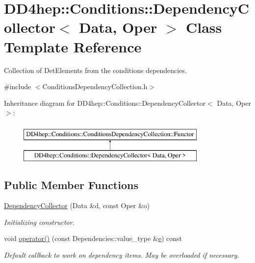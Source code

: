 \hypertarget{class_d_d4hep_1_1_conditions_1_1_dependency_collector}{}\section{D\+D4hep\+:\+:Conditions\+:\+:Dependency\+Collector$<$ Data, Oper $>$ Class Template Reference}
\label{class_d_d4hep_1_1_conditions_1_1_dependency_collector}


Collection of Det\+Elements from the conditions dependencies.  




{\ttfamily \#include $<$Conditions\+Dependency\+Collection.\+h$>$}

Inheritance diagram for D\+D4hep\+:\+:Conditions\+:\+:Dependency\+Collector$<$ Data, Oper $>$\+:\begin{figure}[H]
\begin{center}
\leavevmode
\includegraphics[height=2.000000cm]{class_d_d4hep_1_1_conditions_1_1_dependency_collector}
\end{center}
\end{figure}
\subsection*{Public Member Functions}
\begin{DoxyCompactItemize}
\item 
\hyperlink{class_d_d4hep_1_1_conditions_1_1_dependency_collector_a7631c949b34eeb87fa8aea7ea166c356}{Dependency\+Collector} (Data \&d, const Oper \&o)
\begin{DoxyCompactList}\small\item\em Initializing constructor. \end{DoxyCompactList}\item 
void \hyperlink{class_d_d4hep_1_1_conditions_1_1_dependency_collector_a53765a0a554a15af435754b94c165e31}{operator()} (const Dependencies\+::value\+\_\+type \&\hyperlink{_volumes_8cpp_a8a9a1f93e9b09afccaec215310e64142}{e}) const
\begin{DoxyCompactList}\small\item\em Default callback to work on dependency items. May be overloaded if necessary. \end{DoxyCompactList}\end{DoxyCompactItemize}
